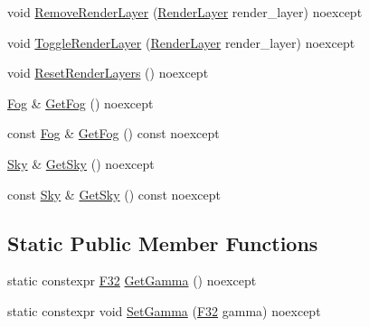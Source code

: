 \begin{DoxyCompactItemize}
\item 
void \mbox{\hyperlink{classmage_1_1rendering_1_1_camera_settings_a49c766f4880c798a90a9b8fe488a6711}{Remove\+Render\+Layer}} (\mbox{\hyperlink{namespacemage_1_1rendering_a466c2a441ea5b26e4625c2f34e021b3d}{Render\+Layer}} render\+\_\+layer) noexcept
\item 
void \mbox{\hyperlink{classmage_1_1rendering_1_1_camera_settings_a95c531aba7bbddba9ea47000de3c53b2}{Toggle\+Render\+Layer}} (\mbox{\hyperlink{namespacemage_1_1rendering_a466c2a441ea5b26e4625c2f34e021b3d}{Render\+Layer}} render\+\_\+layer) noexcept
\item 
void \mbox{\hyperlink{classmage_1_1rendering_1_1_camera_settings_a954a0af8d7939069e32b77abc23f95d0}{Reset\+Render\+Layers}} () noexcept
\item 
\mbox{\hyperlink{classmage_1_1rendering_1_1_fog}{Fog}} \& \mbox{\hyperlink{classmage_1_1rendering_1_1_camera_settings_a47b2b9eeca9d9eec61a7e290e1abfa43}{Get\+Fog}} () noexcept
\item 
const \mbox{\hyperlink{classmage_1_1rendering_1_1_fog}{Fog}} \& \mbox{\hyperlink{classmage_1_1rendering_1_1_camera_settings_acd360516b025b09c2ac668f48d6259c7}{Get\+Fog}} () const noexcept
\item 
\mbox{\hyperlink{classmage_1_1rendering_1_1_sky}{Sky}} \& \mbox{\hyperlink{classmage_1_1rendering_1_1_camera_settings_a3538572fc79fa03380cb9ed8cceeba42}{Get\+Sky}} () noexcept
\item 
const \mbox{\hyperlink{classmage_1_1rendering_1_1_sky}{Sky}} \& \mbox{\hyperlink{classmage_1_1rendering_1_1_camera_settings_a0045fb85eafcb33dff43c04656c4cc3b}{Get\+Sky}} () const noexcept
\end{DoxyCompactItemize}
\subsection*{Static Public Member Functions}
\begin{DoxyCompactItemize}
\item 
static constexpr \mbox{\hyperlink{namespacemage_aa97e833b45f06d60a0a9c4fc22ae02c0}{F32}} \mbox{\hyperlink{classmage_1_1rendering_1_1_camera_settings_a509a248399b2db684ce53625f3afdb5d}{Get\+Gamma}} () noexcept
\item 
static constexpr void \mbox{\hyperlink{classmage_1_1rendering_1_1_camera_settings_ae186332d3c4a89c43ef59ed726c709ca}{Set\+Gamma}} (\mbox{\hyperlink{namespacemage_aa97e833b45f06d60a0a9c4fc22ae02c0}{F32}} gamma) noexcept
\end{DoxyCompactItemize}
